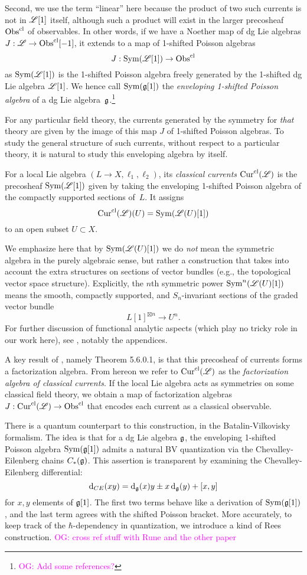 \documentclass[10pt]{amsart}
\def\owen{\textcolor{magenta}{OG: }\textcolor{magenta}}
\def\Cur{{\rm Cur}}
\begin{document}
Second, we use the term ``linear'' here because the product of two such currents is not in $\mathscr L[1]$ itself, 
although such a product will exist in the larger precosheaf ${\rm Obs}^{\rm cl}$ of observables.
In other words, if we have a Noether map of dg Lie algebras $J: \mathscr L \to {\rm Obs}^{\rm cl}[-1]$,
it extends to a map of 1-shifted Poisson algebras
\[
J: {\rm Sym}(\mathscr L[1]) \to {\rm Obs}^{\rm cl}
\]
as ${\rm Sym}(\mathscr L[1])$ is the 1-shifted Poisson algebra freely generated by the 1-shifted dg Lie algebra $\mathscr L[1]$.
We hence call ${\rm Sym}(\mathfrak g[1])$ the {\em enveloping 1-shifted Poisson algebra} of a dg Lie algebra~$\mathfrak g$.\footnote{\owen{Add some references?}}

For any particular field theory, the currents generated by the symmetry for {\em that} theory are given by the image of this map $J$ of 1-shifted Poisson algebras.
To study the general structure of such currents, without respect to a particular theory,
it is natural to study this enveloping algebra by itself.

\begin{dfn}
For a local Lie algebra $(L\to X, \ell_1,\ell_2)$, its {\em classical currents} $\Cur^\cl(\sL)$ is the precosheaf ${\rm Sym}(\mathscr L[1])$ given by taking the enveloping 1-shifted Poisson algebra of the compactly supported sections of~$L$.
It assigns
\[
\Cur^\cl(\sL)(U) = \Sym(\sL(U)[1])
\]
to an open subset $U \subset X$. 
\end{dfn}

We emphasize here that by ${\rm Sym}(\mathscr L(U)[1])$ we do {\em not} mean the symmetric algebra in the purely algebraic sense, but rather a construction that takes into account the extra structures on sections of vector bundles (e.g., the topological vector space structure).
Explicitly, the $n$th symmetric power  ${\rm Sym}^n(\mathscr L(U)[1])$ means the smooth, compactly supported, and $S_n$-invariant sections of the graded vector bundle 
\[
L[1]^{\boxtimes n} \to U^n.
\]
For further discussion of functional analytic aspects (which play no tricky role in our work here),
see \cite{CG1}, notably the appendices.

A key result of \cite{CG1}, namely Theorem 5.6.0.1, is that this precosheaf of currents forms a factorization algebra. 
From hereon we refer to  $\Cur^\cl(\sL)$ as the {\em factorization algebra of classical currents}.
If the local Lie algebra acts as symmetries on some classical field theory,
we obtain a map of factorization algebras $J: \Cur^\cl(\sL) \to \Obs^\cl$ that encodes each current as a classical observable.

There is a quantum counterpart to this construction, in the Batalin-Vilkovisky formalism.
The idea is that for a dg Lie algebra $\mathfrak g$, 
the enveloping 1-shifted Poisson algebra ${\rm Sym}(\mathfrak g[1])$ admits a natural BV quantization via the Chevalley-Eilenberg chains $C_*(\mathfrak g)$.  
This assertion is transparent by examining the Chevalley-Eilenberg differential:
\[
{\rm d}_{CE}(xy) = {\rm d}_\mathfrak g(x)y \pm x\, {\rm d}_\mathfrak g(y) + [x,y]
\]
for $x,y$ elements of $\mathfrak g[1]$.
The first two terms behave like a derivation of ${\rm Sym}(\mathfrak g[1])$, 
and the last term agrees with the shifted Poisson bracket.
More accurately, to keep track of the $\hbar$-dependency in quantization,
we introduce a kind of Rees construction.
\owen{cross ref stuff with Rune and the other paper}
\end{document}
